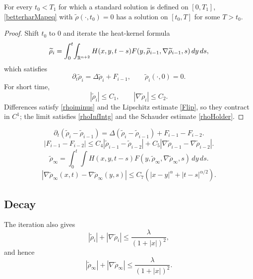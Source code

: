 \begin{proposition}
\label{prop:harmonic-map-flow-short-time-existence}

For every $t_0<T_1$ for which a standard solution is defined on $[0,T_1]$,
\eqref{betterharMapeq} with $\tilde\rho(\cdot,t_0)=0$ has a solution on
$[t_0,T]$ for some $T>t_0$.
\end{proposition}
\begin{proof}
\sketch Shift $t_0$ to $0$ and iterate the heat-kernel formula
\begin{equation}\label{rhoIntg}
 \widetilde\rho_i=\int_0^t\!\int_{\mathbb{R}^{n+2}}H(x,y,t-s)F(y,\widetilde\rho_{i-1},\nabla\widetilde\rho_{i-1},s)\,dy\,ds,
\end{equation}
which satisfies
\begin{equation}\label{rhodiffeq}\partial_t\tilde\rho_i=\Delta\tilde\rho_i+F_{i-1},\qquad\tilde\rho_i(\cdot,0)=0.\end{equation}
For short time,
\begin{equation}\label{rho_i est}|\tilde\rho_i|\le C_1,\qquad|\nabla\tilde\rho_i|\le C_2.\end{equation}
Differences satisfy \eqref{rhoiminus} and the Lipschitz estimate \eqref{Flip},
so they contract in $C^1$; the limit satisfies \eqref{rhoInfIntg} and
the Schauder estimate \eqref{rhoHolder}.
\end{proof}
\begin{equation}\label{rhoiminus}
\partial_t(\tilde\rho_i-\tilde\rho_{i-1})=\Delta(\tilde\rho_i-\tilde\rho_{i-1})+F_{i-1}-F_{i-2}.
\end{equation}
\begin{equation}\label{Flip}|F_{i-1}-F_{i-2}|\le C_4|\tilde\rho_{i-1}-\tilde\rho_{i-2}|+C_5|\nabla\tilde\rho_{i-1}-\nabla\tilde\rho_{i-2}|.\end{equation}
\begin{equation}\label{rhoInfIntg}\tilde\rho_\infty=\int_0^t\!\int H(x,y,t-s)F(y,\tilde\rho_\infty,\nabla\tilde\rho_\infty,s)\,dy\,ds.\end{equation}
\begin{equation}\label{rhoHolder}|\nabla\tilde\rho_\infty(x,t)-\nabla\tilde\rho_\infty(y,s)|\le C_7(|x-y|^\alpha+|t-s|^{\alpha/2}).\end{equation}

\subsection{Decay}\label{harmsec}
The iteration also gives
\begin{equation}\label{rho_iDcay}|\tilde\rho_i|+|\nabla\tilde\rho_i|\le\frac\lambda{(1+|x|)^2},\end{equation}
and hence
\begin{equation}\label{rhodecay}|\tilde\rho_\infty|+|\nabla\tilde\rho_\infty|\le\frac\lambda{(1+|x|)^2}.\end{equation}

